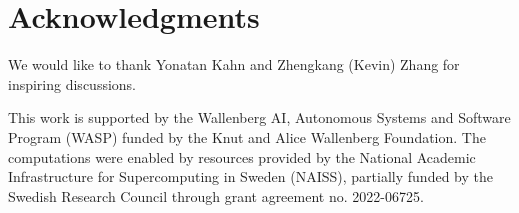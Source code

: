 \section*{Acknowledgments}
We would like to thank Yonatan Kahn and Zhengkang (Kevin) Zhang for inspiring discussions.

This work is supported by the Wallenberg AI, Autonomous Systems and Software Program (WASP) funded by the Knut and Alice Wallenberg Foundation. The computations were enabled by resources provided by the National Academic Infrastructure for Supercomputing in Sweden (NAISS), partially funded by the Swedish Research Council through grant agreement no. 2022-06725.

